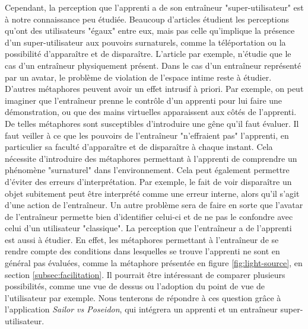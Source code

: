 \documentclass[11pt]{article}
\begin{document}
Cependant, la perception que l'apprenti a de son entraîneur "super-utilisateur" est à notre connaissance peu étudiée. Beaucoup d'articles étudient les perceptions qu'ont des utilisateurs "égaux" entre eux, mais pas celle qu'implique la présence d'un super-utilisateur aux pouvoirs surnaturels, comme la téléportation ou la possibilité d'apparaître et de disparaître. L'article \cite{show-through} par exemple, n'étudie que le cas d'un entraîneur physiquement présent. Dans le cas d'un entraîneur représenté par un avatar, le problème de violation de l'espace intime reste à étudier. D'autres métaphores peuvent avoir un effet intrusif à priori. Par exemple, on peut imaginer que l'entraîneur prenne le contrôle d'un apprenti pour lui faire une démonstration, ou que des mains virtuelles apparaissent aux côtés de l'apprenti. De telles métaphores sont susceptibles d'introduire une gêne qu'il faut évaluer. Il faut veiller à ce que les pouvoirs de l'entraîneur "n'effraient pas" l'apprenti, en particulier sa faculté d'apparaître et de disparaître à chaque instant. Cela nécessite d'introduire des métaphores permettant à l'apprenti de comprendre un phénomène "surnaturel" dans l'environnement. Cela peut également permettre d'éviter des erreurs d'interprétation. Par exemple, le fait de voir disparaître un objet subitement peut être interprété comme une erreur interne, alors qu'il s'agit d'une action de l'entraîneur. Un autre problème sera de faire en sorte que l'avatar de l'entraîneur permette bien d'identifier celui-ci et de ne pas le confondre avec celui d'un utilisateur "classique". La perception que l'entraîneur a de l'apprenti est aussi à étudier. En effet, les métaphores permettant à l'entraîneur de se rendre compte des conditions dans lesquelles se trouve l'apprenti ne sont en général pas évaluées, comme la métaphore présentée en figure \ref{fig:light-source}, en section \ref{subsec:facilitation}. Il pourrait être intéressant de comparer plusieurs possibilités, comme une vue de dessus ou l'adoption du point de vue de l'utilisateur par exemple. Nous tenterons de répondre à ces question grâce à l'application \textit{Sailor vs Poseidon}, qui intégrera un apprenti et un entraîneur super-utilisateur.


 
\end{document}
